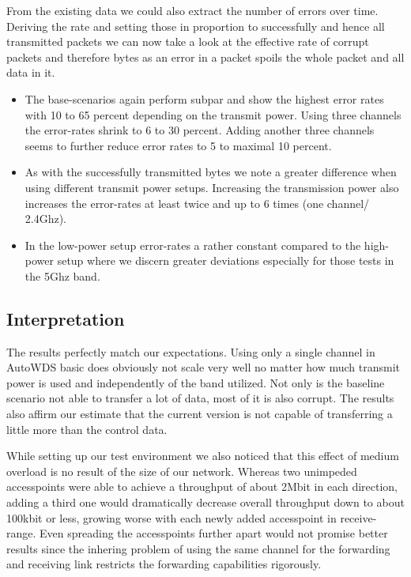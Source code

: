     From the existing data we could also extract the number of errors over time. Deriving the rate and setting those in proportion to
    successfully and hence all transmitted packets we can now take a look at the effective rate of corrupt packets and therefore bytes as an error in a packet 
    spoils the whole packet and all data in it.
    \begin{itemize}
      \item The base-scenarios again perform subpar and show the highest error rates with 10 to 65 percent depending on the transmit power.
	Using three channels the error-rates shrink to 6 to 30 percent.
	Adding another three channels seems to further reduce error rates to 5 to maximal 10 percent.
      \item As with the successfully transmitted bytes we note a greater difference when using different transmit power setups. 
	Increasing the transmission power also increases the error-rates at least twice and up to 6 times (one channel/ 2.4Ghz).
      \item In the low-power setup error-rates a rather constant compared to the high-power setup where we discern greater deviations especially for those tests in the 5Ghz band.
    \end{itemize}
   
  \subsection{Interpretation}
    The results perfectly match our expectations. Using only a single channel in AutoWDS basic 
    does obviously not scale very well no matter how much transmit power is used and independently of the band utilized.
    Not only is the baseline scenario not able to transfer a lot of data, most of it is also corrupt.
    The results also affirm our estimate that the current version is not capable of transferring a little more than the control data.
    
    While setting up our test environment we also noticed that this effect of medium overload is no result of the size of our network.
    Whereas two unimpeded accesspoints were able to achieve a throughput of about 2Mbit in each direction, adding a third one would dramatically 
    decrease overall throughput down to about 100kbit or less, growing worse with each newly added accesspoint in receive-range. Even spreading the 
    accesspoints further apart would not promise better results since the inhering problem of using the same channel for the forwarding and receiving 
    link restricts the forwarding capabilities rigorously.
     
